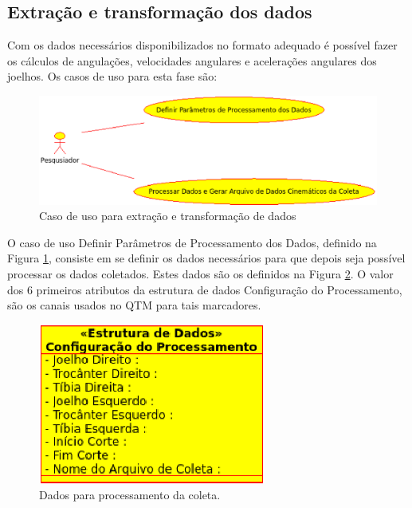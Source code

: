 \subsection[Extração e transformação dos dados]{\textbf{Extração e transformação dos dados}}
Com os dados necessários disponibilizados no formato adequado é possível fazer os cálculos de angulações, velocidades angulares e acelerações angulares dos joelhos. Os casos de uso para esta fase são:
\begin{figure}[ht]
	\centering
	\includegraphics[width=15cm]{figuras/extracao_coleta.eps}
	\caption{Caso de uso para extração e transformação de dados}
	\label{extracao_coleta}
\end{figure}

O caso de uso Definir Parâmetros de Processamento dos Dados, definido na Figura \ref{extracao_coleta}, consiste em se definir os dados necessários para que depois seja possível processar os dados coletados. 
Estes dados são os definidos na Figura \ref{estrutura_dados}. 
O valor dos 6 primeiros atributos da estrutura de dados Configuração do Processamento, são os canais usados no QTM para tais marcadores.
\begin{figure}[ht]
	\centering
	\includegraphics[width=7.5cm]{figuras/estrutura_dados.eps}
	\caption{Dados para processamento da coleta.}
	\label{estrutura_dados}
\end{figure}

